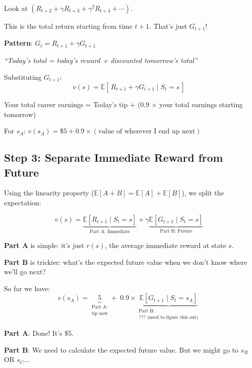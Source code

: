 \documentclass[journal, onecolumn]{IEEEtran}
\begin{document}
\begin{tcolorbox}[memorybox={The Magic Recognition}]
Look at $(R_{t+2} + \gamma R_{t+3} + \gamma^2 R_{t+4} + \cdots)$.

This is the total return starting from time $t+1$. That's just $G_{t+1}$!

\textbf{Pattern}: $G_t = R_{t+1} + \gamma G_{t+1}$

\textit{``Today's total = today's reward + discounted tomorrow's total''}
\end{tcolorbox}

Substituting $G_{t+1}$:
\begin{equation}
    v(s) = \mathbb{E}[\,R_{t+1} + \gamma G_{t+1} \mid S_t = s\,]
    \label{eq:step2}
\end{equation}

\begin{tcolorbox}[examplebox={Pizza Delivery Intuition}]
Your total career earnings = Today's tip + (0.9 $\times$ your total earnings starting tomorrow)

For $s_A$: \quad $v(s_A) = \$5 + 0.9 \times (\text{value of wherever I end up next})$
\end{tcolorbox}

\newpage
\subsection{Step 3: Separate Immediate Reward from Future}

Using the linearity property ($\mathbb{E}[A + B] = \mathbb{E}[A] + \mathbb{E}[B]$), we split the expectation:

\begin{equation}
    v(s) = \underbrace{\mathbb{E}[R_{t+1} \mid S_t = s]}_{\text{Part A: Immediate}} + \gamma \underbrace{\mathbb{E}[G_{t+1} \mid S_t = s]}_{\text{Part B: Future}}
    \label{eq:step3}
\end{equation}

\textbf{Part A} is simple: it's just $r(s)$, the average immediate reward at state $s$.

\textbf{Part B} is trickier: what's the expected future value when we don't know where we'll go next?

\begin{tcolorbox}[examplebox={Progress Check for $s_A$}]
So far we have:
\[ v(s_A) = \underbrace{5}_{\substack{\text{Part A:}\\\text{tip now}}} + \; 0.9 \times \underbrace{\mathbb{E}[G_{t+1} \mid S_t = s_A]}_{\substack{\text{Part B:}\\\text{??? (need to figure this out)}}} \]

\textbf{Part A}: Done! It's \$5.

\textbf{Part B}: We need to calculate the expected future value. But we might go to $s_B$ OR $s_C$...
\end{tcolorbox}
\end{document}
